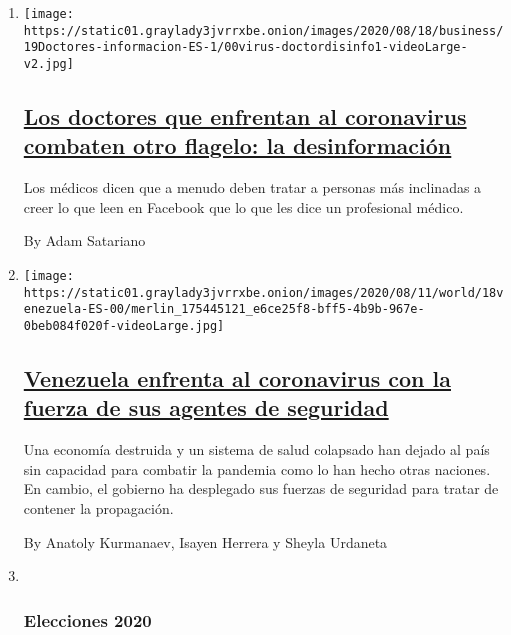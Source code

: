 \begin{enumerate}
\def\labelenumi{\arabic{enumi}.}
\item
  \texttt{[image: https://static01.graylady3jvrrxbe.onion/images/2020/08/18/business/19Doctores-informacion-ES-1/00virus-doctordisinfo1-videoLarge-v2.jpg]}

  \hypertarget{los-doctores-que-enfrentan-al-coronavirus-combaten-otro-flagelo-la-desinformaciuxf3n}{%
  \subsection{\texorpdfstring{\href{/es/2020/08/20/espanol/ciencia-y-tecnologia/desinformacion-coronavirus.html}{Los
  doctores que enfrentan al coronavirus combaten otro flagelo: la
  desinformación}}{Los doctores que enfrentan al coronavirus combaten otro flagelo: la desinformación}}\label{los-doctores-que-enfrentan-al-coronavirus-combaten-otro-flagelo-la-desinformaciuxf3n}}

  Los médicos dicen que a menudo deben tratar a personas más inclinadas
  a creer lo que leen en Facebook que lo que les dice un profesional
  médico.

  By Adam Satariano
\item
  \texttt{[image: https://static01.graylady3jvrrxbe.onion/images/2020/08/11/world/18venezuela-ES-00/merlin\_175445121\_e6ce25f8-bff5-4b9b-967e-0beb084f020f-videoLarge.jpg]}

  \hypertarget{venezuela-enfrenta-al-coronavirus-con-la-fuerza-de-sus-agentes-de-seguridad}{%
  \subsection{\texorpdfstring{\href{/es/2020/08/19/espanol/america-latina/venezuela-represion-coronavirus.html}{Venezuela
  enfrenta al coronavirus con la fuerza de sus agentes de
  seguridad}}{Venezuela enfrenta al coronavirus con la fuerza de sus agentes de seguridad}}\label{venezuela-enfrenta-al-coronavirus-con-la-fuerza-de-sus-agentes-de-seguridad}}

  Una economía destruida y un sistema de salud colapsado han dejado al
  país sin capacidad para combatir la pandemia como lo han hecho otras
  naciones. En cambio, el gobierno ha desplegado sus fuerzas de
  seguridad para tratar de contener la propagación.

  By Anatoly Kurmanaev, Isayen Herrera y Sheyla Urdaneta
\item ~
  \hypertarget{elecciones-2020-2}{%
  \subsubsection{Elecciones 2020}\label{elecciones-2020-2}}


\end{enumerate}
